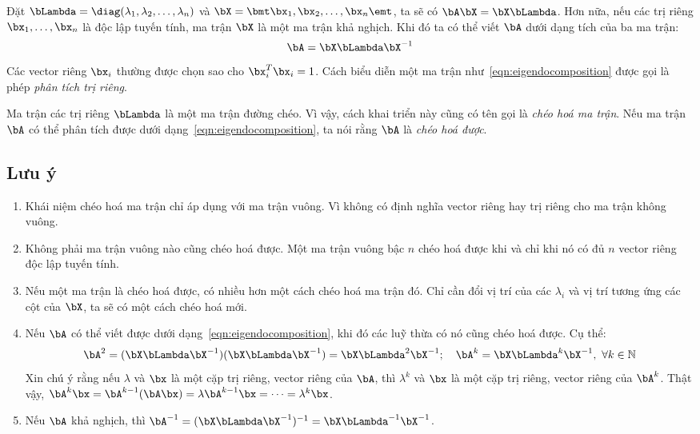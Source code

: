 Đặt $\bLambda = \diag(\lambda_1, \lambda_2, \dots, \lambda_n)$ và
$\bX = \bmt \bx_1, \bx_2, \dots, \bx_n \emt$, ta sẽ có $\bA\bX = \bX\bLambda$.
Hơn nữa, nếu các trị riêng $\bx_1, \dots, \bx_n$ là độc lập tuyến tính, ma trận
$\bX$ là một ma trận khả nghịch. Khi đó ta có thể viết $\bA$ dưới dạng tích của
ba ma trận:
\begin{equation}
\label{eqn:eigendocomposition}
    \bA = \bX\bLambda\bX^{-1}
\end{equation}
Các vector riêng $\bx_i$ thường được chọn sao cho $\bx_i^T\bx_i = 1$. Cách biểu
diễn một ma trận như~\eqref{eqn:eigendocomposition} được gọi là phép
\textit{phân tích trị riêng}.

Ma trận các trị riêng $\bLambda$ là một ma trận đường chéo. Vì vậy, cách khai
triển này cũng có tên gọi là \textit{chéo hoá ma trận}. Nếu ma trận $\bA$ có thể
phân tích được dưới dạng~\eqref{eqn:eigendocomposition}, ta nói rằng $\bA$ là
\textit{chéo hoá được}.

\subsection{Lưu ý} %
\label{sub:luu y}

\begin{enumerate}

    \item Khái niệm chéo hoá ma trận chỉ áp dụng với ma trận vuông. Vì không có
    định nghĩa vector riêng hay trị riêng cho ma trận không vuông.

    \item Không phải ma trận vuông nào cũng chéo hoá được. Một ma trận
    vuông bậc $n$ chéo hoá được khi và chỉ khi nó có đủ $n$ vector riêng độc lập
    tuyến tính.

    \item Nếu một ma trận là chéo hoá được, có nhiều hơn một cách chéo hoá ma
    trận đó. Chỉ cần đổi vị trí của các $\lambda_i$ và vị trí tương ứng
    các cột của $\bX$, ta sẽ có một cách chéo hoá mới.

    \item Nếu $\bA$ có thể viết được dưới dạng~\eqref{eqn:eigendocomposition},
    khi đó các luỹ thừa có nó cũng chéo hoá được. Cụ thể:
    \begin{equation}
        \bA^2 = (\bX \bLambda \bX^{-1})(\bX \bLambda \bX^{-1}) =
        \bX\bLambda^2\bX^{-1}; \quad \bA^k = \bX \bLambda^k \bX^{-1}, ~\forall k \in
        \mathbb{N}
    \end{equation}
    Xin chú ý rằng nếu $\lambda$ và $\bx$ là một cặp trị riêng, vector riêng
    của $\bA$, thì $\lambda^k$ và $\bx$ là một cặp  trị riêng, vector riêng
    của $\bA^k$. Thật vậy, $\bA^k \bx = \bA^{k-1}(\bA\bx) = \lambda \bA^
    {k-1}\bx = \dots = \lambda^k \bx$.

    \item Nếu $\bA$ khả nghịch, thì $\bA^{-1} = (\bX \bLambda \bX^{-1})^{-1} =
    \bX \bLambda^{-1}\bX^{-1}$. 
\end{enumerate}

